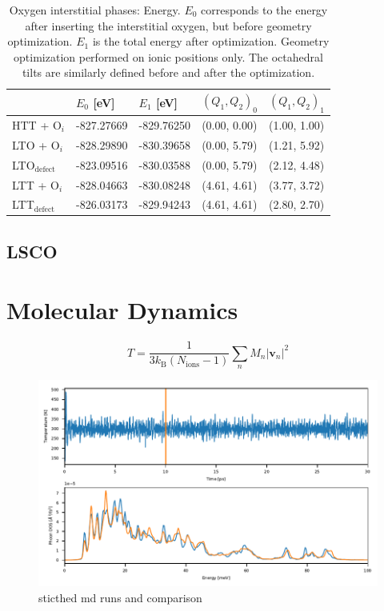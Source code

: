 \begin{table}[b]
	\centering
	\caption[Oxygen interstitial phases: Energy]{Oxygen interstitial phases: Energy. $E_0$ corresponds to the energy after inserting the interstitial oxygen, but before geometry optimization. $E_1$ is the total energy after optimization. Geometry optimization performed on ionic positions only. The octahedral tilts are similarly defined before and after the optimization.}
	\label{tab:oint_en}
	\begin{tabular}{@{}lllll@{}}
    \toprule
	 & $E_0$ [eV] & $E_1$ [eV] & $(Q_1, Q_2)_0$ & $(Q_1, Q_2)_1$  \\ 
	\midrule
    HTT + O$_i$                    & -827.27669             & -829.76250 & (0.00, 0.00) & (1.00, 1.00) \\
    LTO + O$_i$                    & -828.29890             & -830.39658  & (0.00, 5.79) & (1.21, 5.92) \\
    LTO$_\text{defect}$              & -823.09516             & -830.03588  & (0.00, 5.79) & (2.12, 4.48) \\
    LTT + O$_i$                    & -828.04663             & -830.08248  & (4.61, 4.61) & (3.77, 3.72) \\
	LTT$_\text{defect}$              & -826.03173             & -829.94243  & (4.61, 4.61) & (2.80, 2.70) \\ 
	\bottomrule
    \end{tabular}
\end{table}

\subsection{LSCO}

\section{Molecular Dynamics}
\[ T = \frac{1}{3 k_\text{B} (N_\text{ions}-1)} \sum_n M_n |\bm{v}_n|^2 \]

\begin{figure}
	\centering
	\includegraphics[width=\textwidth]{fig/md/stitch.pdf}
	\caption[stitched md runs]{sticthed md runs and comparison}
	\label{fig:stitch}
\end{figure}

